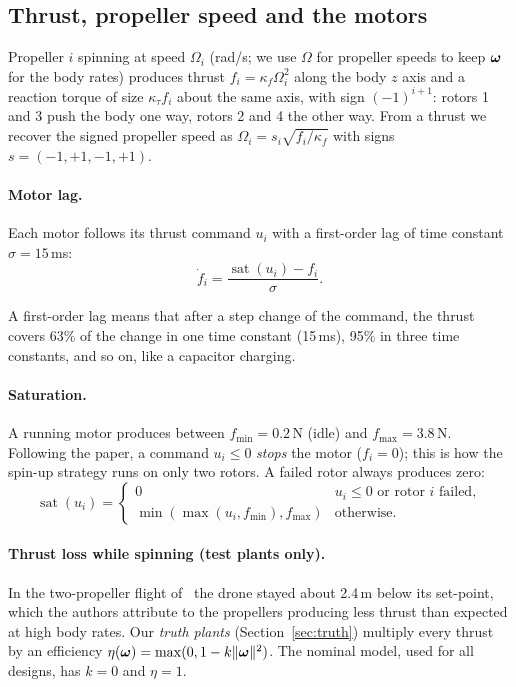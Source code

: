 \subsection{Thrust, propeller speed and the motors}
Propeller $i$ spinning at speed $\Omega_i$ (rad/s; we use $\Omega$ for propeller speeds to keep $\boldsymbol{\omega}$ for the body rates) produces thrust $f_i = \kappa_f\Omega_i^2$ along the body $z$ axis and a reaction torque of size $\kappa_\tau f_i$ about the same axis, with sign $(-1)^{i+1}$: rotors 1 and 3 push the body one way, rotors 2 and 4 the other way. From a thrust we recover the signed propeller speed as $\Omega_i = s_i\sqrt{f_i/\kappa_f}$ with signs $s=(-1,+1,-1,+1)$.

\paragraph{Motor lag.} Each motor follows its thrust command $u_i$ with a first-order lag of time constant $\sigma = 15$\,ms:
\begin{equation}
  \dot f_i = \frac{\operatorname{sat}(u_i) - f_i}{\sigma}.
\end{equation}
\begin{plain}
A first-order lag means that after a step change of the command, the thrust covers 63\% of the change in one time constant (15\,ms), 95\% in three time constants, and so on, like a capacitor charging.
\end{plain}

\paragraph{Saturation.} A running motor produces between $f_{\min}=0.2$\,N (idle) and $f_{\max}=3.8$\,N. Following the paper, a command $u_i\le0$ \emph{stops} the motor ($f_i=0$); this is how the spin-up strategy runs on only two rotors. A failed rotor always produces zero:
\begin{equation}
  \operatorname{sat}(u_i) = \begin{cases} 0 & u_i \le 0 \text{ or rotor $i$ failed},\\ \min(\max(u_i, f_{\min}), f_{\max}) & \text{otherwise.}\end{cases}
\end{equation}

\paragraph{Thrust loss while spinning (test plants only).} In the two-propeller flight of~\cite{mueller2014stability} the drone stayed about 2.4\,m below its set-point, which the authors attribute to the propellers producing less thrust than expected at high body rates. Our \emph{truth plants} (Section~\ref{sec:truth}) multiply every thrust by an efficiency $\eta(\boldsymbol{\omega}) = \max(0, 1-k\|\boldsymbol{\omega}\|^2)$. The nominal model, used for all designs, has $k=0$ and $\eta=1$.

